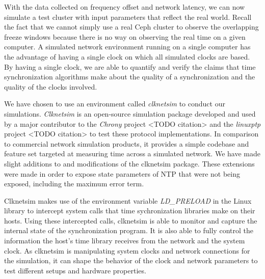 With the data collected on frequency offset and network latency, we can 
now simulate a test cluster with input parameters that reflect the 
real world. Recall the fact that we cannot simply use a real Ceph
cluster to observe the overlapping freeze windows because there is no
way on observing the real time on a given computer. A
simulated network environment running on a single computer has the
advantage of having a single clock on which all simulated clocks are
based. By having a single clock, we are able to quantify and verify
the claims that time synchronization algorithms make about the quality
of a synchronization and the quality of the clocks involved.


We have chosen to use an environment called \textit{clknetsim} %
to conduct our simulations. \textit{Clknetsim} is an open-source simulation 
package developed and used by a major contributor to the \textit{Chrony}
project <TODO citation> and the \textit{linuxptp} project <TODO citation> 
to test these protocol implementations. In
comparison to commercial network simulation products, it provides a 
simple codebase and feature set targeted at measuring 
time across a simulated network. We have made slight additions to and
modifications of the clknetsim package. These extensions were made in 
order to expose state parameters of NTP that were not being exposed, 
including the maximum error term.

Clknetsim makes use of the environment variable \textit{LD\_PRELOAD} in
the Linux library to intercept system calls that time sychronization 
libraries make on their hosts. Using these intercepted calls, 
clknetsim is able to monitor and capture the internal state of
the synchronization program. It is also able to fully control the
information the host's time library receives from the network and the system
clock. As clknetsim is manipulating system clocks and network
connections for the simulation, it can shape the behavior of the clock
and network parameters to test different setups and hardware properties. 
        
